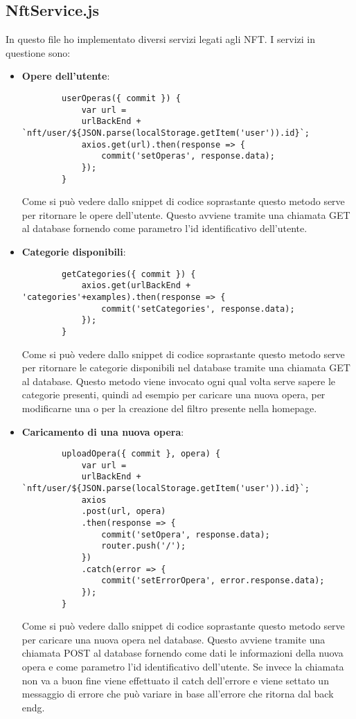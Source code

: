 \subsection{NftService.js}
\label{subsubsec:nftservice}

In questo file ho implementato diversi servizi legati agli NFT. I servizi in questione sono:
\begin{itemize}
	\item \textbf{Opere dell'utente}:
	\begin{lstlisting}
		userOperas({ commit }) {
			var url =
			urlBackEnd + `nft/user/${JSON.parse(localStorage.getItem('user')).id}`;
			axios.get(url).then(response => {
				commit('setOperas', response.data);
			});
		}
	\end{lstlisting}
	Come si può vedere dallo snippet di codice soprastante questo metodo serve per ritornare le opere dell'utente. Questo avviene tramite una chiamata GET al database fornendo come parametro l'id identificativo dell'utente.
	\item \textbf{Categorie disponibili}:
	\begin{lstlisting}
		getCategories({ commit }) {
			axios.get(urlBackEnd + 'categories'+examples).then(response => {
				commit('setCategories', response.data);
			});
		}
	\end{lstlisting}
	Come si può vedere dallo snippet di codice soprastante questo metodo serve per ritornare le categorie disponibili nel database tramite una chiamata GET al database. Questo metodo viene invocato ogni qual volta serve sapere le categorie presenti, quindi ad esempio per caricare una nuova opera, per modificarne una o per la creazione del filtro presente nella homepage.
	\item \textbf{Caricamento di una nuova opera}:
	\begin{lstlisting}
		uploadOpera({ commit }, opera) {
			var url =
			urlBackEnd + `nft/user/${JSON.parse(localStorage.getItem('user')).id}`;
			axios
			.post(url, opera)
			.then(response => {
				commit('setOpera', response.data);
				router.push('/');
			})
			.catch(error => {
				commit('setErrorOpera', error.response.data);
			});
		}
	\end{lstlisting}
	Come si può vedere dallo snippet di codice soprastante questo metodo serve per caricare una nuova opera nel database. Questo avviene tramite una chiamata POST al database fornendo come dati le informazioni della nuova opera e come parametro l'id identificativo dell'utente. Se invece  la chiamata non va a buon fine viene effettuato il catch dell'errore e viene settato un messaggio di errore che può variare in base all'errore che ritorna dal \gls{back endg}.

\end{itemize}

